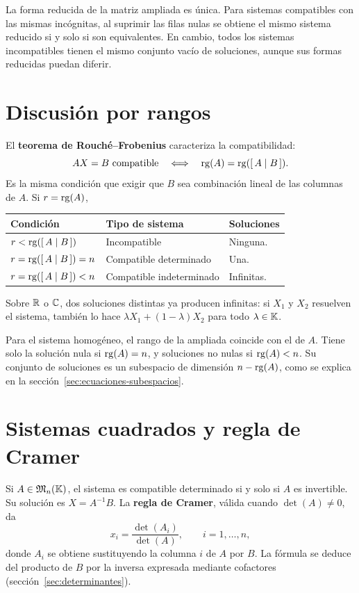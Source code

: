La forma reducida de la matriz ampliada es única. Para sistemas compatibles
con las mismas incógnitas, al suprimir las filas nulas se obtiene el mismo
sistema reducido si y solo si son equivalentes. En cambio, todos los
sistemas incompatibles tienen el mismo conjunto vacío de soluciones,
aunque sus formas reducidas puedan diferir.

\section{Discusión por rangos}
\label{sec:rouche}

El \textbf{teorema de Rouché--Frobenius} caracteriza la compatibilidad:
\[
 AX=B\text{ compatible}\quad\Longleftrightarrow\quad
 \operatorname{rg}(A)=\operatorname{rg}([\,A\mid B\,]).
\]
Es la misma condición que exigir que $B$ sea combinación lineal de
las columnas de $A$. Si $r=\operatorname{rg}(A)$,
\begin{center}
\begin{tabular}{@{}lll@{}}
\toprule
Condición & Tipo de sistema & Soluciones \\
\midrule
$r<\operatorname{rg}([\,A\mid B\,])$ & Incompatible & Ninguna. \\
$r=\operatorname{rg}([\,A\mid B\,])=n$ & Compatible determinado & Una. \\
$r=\operatorname{rg}([\,A\mid B\,])<n$ & Compatible indeterminado & Infinitas. \\
\bottomrule
\end{tabular}
\end{center}
Sobre $\mathbb{R}$ o $\mathbb{C}$, dos soluciones distintas ya producen infinitas:
si $X_1$ y $X_2$ resuelven el sistema, también lo hace
$\lambda X_1+(1-\lambda)X_2$ para todo $\lambda\in\mathbb{K}$.

Para el sistema homogéneo, el rango de la ampliada coincide con el de $A$.
Tiene solo la solución nula si $\operatorname{rg}(A)=n$, y soluciones no nulas si
$\operatorname{rg}(A)<n$. Su conjunto de soluciones es un subespacio de dimensión
$n-\operatorname{rg}(A)$, como se explica en la sección~\ref{sec:ecuaciones-subespacios}.

\section{Sistemas cuadrados y regla de Cramer}
\label{sec:cramer}

Si $A\in\mathfrak{M}_n(\mathbb{K})$, el sistema es compatible determinado si y solo si
$A$ es invertible. Su solución es $X=A^{-1}B$.
La \textbf{regla de Cramer}, válida cuando $\det(A)\ne0$, da
\[
 x_i=\frac{\det(A_i)}{\det(A)},\qquad i=1,\ldots,n,
\]
donde $A_i$ se obtiene sustituyendo la columna $i$ de $A$ por $B$.
La fórmula se deduce del producto de $B$ por la inversa expresada
mediante cofactores (sección~\ref{sec:determinantes}).


